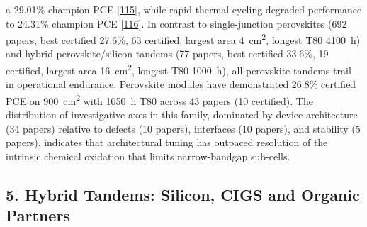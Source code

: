 \documentclass[
  11pt,
]{article}
\begin{document}
a 29.01\% champion PCE
{[}\href{https://doi.org/10.1002/adma.72936}{115}{]}, while rapid
thermal cycling degraded performance to 24.31\% champion PCE
{[}\href{https://doi.org/10.1038/s41467-025-68219-w}{116}{]}. In
contrast to single-junction perovskites (692 papers, best certified
27.6\%, 63 certified, largest area \qty{4}{\centi\meter\squared},
longest T80 \qty{4100}{\hour}) and hybrid perovskite/silicon tandems (77
papers, best certified 33.6\%, 19 certified, largest area
\qty{16}{\centi\meter\squared}, longest T80 \qty{1000}{\hour}),
all-perovskite tandems trail in operational endurance. Perovskite
modules have demonstrated 26.8\% certified PCE on
\qty{900}{\centi\meter\squared} with \qty{1050}{\hour} T80 across 43
papers (10 certified). The distribution of investigative axes in this
family, dominated by device architecture (34 papers) relative to defects
(10 papers), interfaces (10 papers), and stability (5 papers), indicates
that architectural tuning has outpaced resolution of the intrinsic
chemical oxidation that limits narrow-bandgap sub-cells.

\subsection{5. Hybrid Tandems: Silicon, CIGS and Organic
Partners}\label{hybrid-tandems-silicon-cigs-and-organic-partners}
\end{document}
